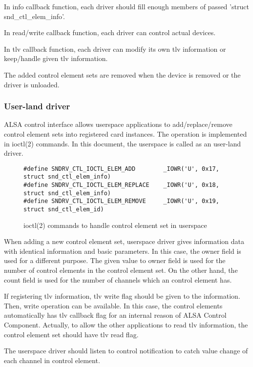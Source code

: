 \documentclass[onecolumn]{article}
\begin{document}
In info callback function, each driver should fill enough members of passed 'struct snd\_ctl\_elem\_info'.

In read/write callback function, each driver can control actual devices.

In tlv callback function, each driver can modify its own tlv information or keep/handle given tlv information.

The added control element sets are removed when the device is removed or the driver is unloaded.


\subsubsection{User-land driver}

ALSA control interface allows userspace applications to add/replace/remove control element sets into registered card instances. The operation is implemented in ioctl(2) commands. In this document, the userspace is called as an user-land driver.

\begin{figure}[htbp]
\small
\begin{verbatim}
#define SNDRV_CTL_IOCTL_ELEM_ADD        _IOWR('U', 0x17, struct snd_ctl_elem_info)
#define SNDRV_CTL_IOCTL_ELEM_REPLACE    _IOWR('U', 0x18, struct snd_ctl_elem_info)
#define SNDRV_CTL_IOCTL_ELEM_REMOVE     _IOWR('U', 0x19, struct snd_ctl_elem_id)
\end{verbatim}
\caption{{ioctl(2) commands to handle control element set in userspace}}
\label{ioctl-commands-userspace-element}
\end{figure}

When adding a new control element set, userspace driver gives information data with identical information and basic parameters. In this case, the owner field is used for a different purpose. The given value to owner field is used for the number of control elements in the control element set. On the other hand, the count field is used for the number of channels which an control element has.

If registering tlv information, tlv write flag should be given to the information. Then, write operation can be available. In this case, the control elements automatically has tlv callback flag for an internal reason of ALSA Control Component. Actually, to allow the other applications to read tlv information, the control element set should have tlv read flag.

The userspace driver should listen to control notification to catch value change of each channel in control element.
\end{document}
